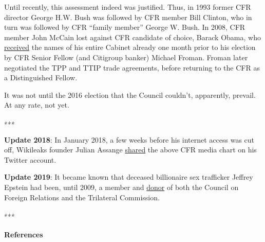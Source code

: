 Until recently, this assessment indeed was justified. Thus, in 1993
former CFR director George H.W. Bush was followed by CFR member Bill
Clinton, who in turn was followed by CFR ``family member'' George W.
Bush. In 2008, CFR member John McCain lost against CFR candidate of
choice, Barack Obama, who
\href{http://observer.com/2016/10/obama-makes-first-appearance-in-wikileaks-receives-admin-list-from-big-banker/}{received}
the names of his entire Cabinet already one month prior to his election
by CFR Senior Fellow (and Citigroup banker) Michael Froman. Froman later
negotiated the TPP and TTIP trade agreements, before returning to the
CFR as a Distinguished Fellow.

It was not until the 2016 election that the Council couldn't,
apparently, prevail. At any rate, not yet.

∗∗∗

\textbf{Update 2018}: In January 2018, a few weeks before his internet
access was cut off, Wikileaks founder Julian Assange
\href{https://swprs.files.wordpress.com/2018/01/assange-tweet.png}{shared}
the above CFR media chart on his Twitter account.

\textbf{Update 2019}: It became known that deceased billionaire sex
trafficker Jeffrey Epstein had been, until 2009, a member and
\href{https://www.washingtonpost.com/politics/council-on-foreign-relations-another-beneficiary-of-epstein-largesse-grapples-with-how-to-handle-his-donations/2019/09/10/1d5630e2-d324-11e9-86ac-0f250cc91758_story.html}{donor}
of both the Council on Foreign Relations and the Trilateral Commission.

∗∗∗

\hypertarget{references}{%
\paragraph{References}\label{references}}

